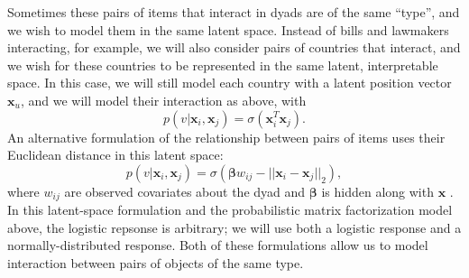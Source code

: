 Sometimes these pairs of items that interact in dyads are of the same
``type'', and we wish to model them in the same latent space.  Instead
of bills and lawmakers interacting, for example, we will also consider
pairs of countries that interact, and we wish for these countries to
be represented in the same latent, interpretable space.  In this case,
we will still model each country with a latent position vector $\bm
x_u$, and we will model their interaction as above, with
\[
  p(v | \bm x_i, \bm x_j) = \sigma(\bm x_i^T \bm x_j).
\]
An alternative formulation of the relationship between pairs of items
uses their Euclidean distance in this latent space:
\[
  p(v | \bm x_i, \bm x_j) = \sigma(\bm \beta w_{ij} - || \bm x_i - \bm x_j ||_2),
\]
where $w_{ij}$ are observed covariates about the dyad and $\bm \beta$
is hidden along with $\bm x$ \cite{hoff:2002}.  In this latent-space
formulation and the probabilistic matrix factorization model above,
the logistic repsonse is arbitrary; we will use both a logistic
response and a normally-distributed response. Both of these
formulations allow us to model interaction between pairs of objects of
the same type.



